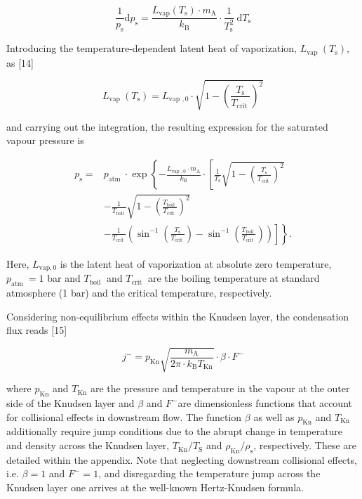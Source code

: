 \documentclass[10pt]{article}
\begin{document}
\begin{equation*}
\frac{1}{p_{\mathrm{s}}} \mathrm{d} p_{\mathrm{s}}=\frac{L_{\mathrm{vap}}\left(T_{\mathrm{s}}\right) \cdot m_{\mathrm{A}}}{k_{\mathrm{B}}} \cdot \frac{1}{T_{\mathrm{s}}^{2}} \mathrm{~d} T_{\mathrm{s}} \tag{3}
\end{equation*}


Introducing the temperature-dependent latent heat of vaporization, $L_{\text {vap }}\left(T_{\mathrm{s}}\right)$, as [14]


\begin{equation*}
L_{\text {vap }}\left(T_{\mathrm{s}}\right)=L_{\text {vap }, 0} \cdot \sqrt{1-\left(\frac{T_{\mathrm{s}}}{T_{\text {crit }}}\right)^{2}} \tag{4}
\end{equation*}


and carrying out the integration, the resulting expression for the saturated vapour pressure is


\begin{align*}
p_{\mathrm{s}}= & p_{\text {atm }} \cdot \exp \left\{-\frac{L_{\text {vap }, 0} \cdot m_{\mathrm{A}}}{k_{\mathrm{B}}} \cdot\left[\frac{1}{T_{\mathrm{s}}} \sqrt{1-\left(\frac{T_{\mathrm{s}}}{T_{\text {crit }}}\right)^{2}}\right.\right. \\
& -\frac{1}{T_{\text {boil }}} \sqrt{1-\left(\frac{T_{\text {boil }}}{T_{\text {crit }}}\right)^{2}} \\
& \left.\left.-\frac{1}{T_{\text {crit }}}\left(\sin ^{-1}\left(\frac{T_{\mathrm{s}}}{T_{\text {crit }}}\right)-\sin ^{-1}\left(\frac{T_{\text {boil }}}{T_{\text {crit }}}\right)\right)\right]\right\} . \tag{5}
\end{align*}


Here, $L_{\mathrm{vap}, 0}$ is the latent heat of vaporization at absolute zero temperature, $p_{\text {atm }}=1$ bar and $T_{\text {boil }}$ and $T_{\text {crit }}$ are the boiling temperature at standard atmosphere (1 bar) and the critical temperature, respectively.

Considering non-equilibrium effects within the Knudsen layer, the condensation flux reads [15]


\begin{equation*}
j^{-}=p_{\mathrm{Kn}} \sqrt{\frac{m_{\mathrm{A}}}{2 \pi \cdot k_{\mathrm{B}} T_{\mathrm{Kn}}}} \cdot \beta \cdot F^{-} \tag{6}
\end{equation*}


where $p_{\mathrm{Kn}}$ and $T_{\mathrm{Kn}}$ are the pressure and temperature in the vapour at the outer side of the Knudsen layer and $\beta$ and $F^{-}$are dimensionless functions that account for collisional effects in downstream flow. The function $\beta$ as well as $p_{\mathrm{Kn}}$ and $T_{\mathrm{Kn}}$ additionally require jump conditions due to the abrupt change in temperature and density across the Knudsen layer, $T_{\mathrm{Kn}} / T_{\mathrm{S}}$ and $\rho_{\mathrm{Kn}} / \rho_{\mathrm{s}}$, respectively. These are detailed within the appendix. Note that neglecting downstream collisional effects, i.e. $\beta=1$ and $F^{-}=1$, and disregarding the temperature jump across the Knudsen layer one arrives at the well-known Hertz-Knudsen formula.
\end{document}
